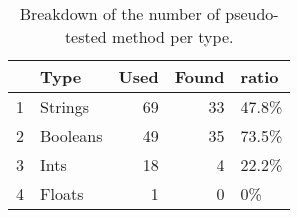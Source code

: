 \begin{table}[H]
\centering
\begin{tabular}{rlrrl}
  \hline
 & Type & Used & Found & ratio \\
  \hline
1 & Strings &  69 &  33 & 47.8\% \\
  2 & Booleans &  49 &  35 & 73.5\% \\
  3 & Ints &  18 &   4 & 22.2\% \\
  4 & Floats &   1 &   0 & 0\% \\
   \hline
\end{tabular}
\caption{Breakdown of the number of pseudo-tested method per type.}~\label{retTable}
\end{table}
